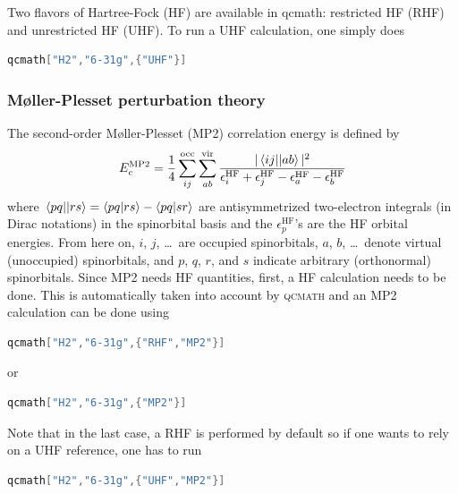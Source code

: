 \documentclass[aip,jcp,reprint,noshowkeys,superscriptaddress]{revtex4-1}
\newcommand{\EcMP}{E_c^{\text{MP2}}}
\newcommand{\eHF}[1]{\epsilon^\text{HF}_{#1}}
\newcommand{\qcmath}{\textsc{qcmath}\xspace}
\begin{document}
Two flavors of Hartree-Fock (HF) are available in qcmath: restricted HF (RHF) and unrestricted HF (UHF). To run a UHF calculation, one simply does
\begin{lstlisting}[extendedchars=true,language=Mathematica]
	qcmath["H2","6-31g",{"UHF"}]
\end{lstlisting}

\subsubsection*{M\o{}ller-Plesset perturbation theory}
The second-order M\o{}ller-Plesset (MP2) correlation energy is defined by 
\begin{equation}
	\EcMP = \frac{1}{4} \sum_{ij}^{\text{occ}} \sum_{ab}^{\text{vir}} \frac{ |\mel{ij}{}{ab}|^2 }{\eHF{i} + \eHF{j} - \eHF{a} - \eHF{b}}
\end{equation}
where $\mel{pq}{}{rs} = \braket{pq}{rs} - \braket{pq}{sr}$ are antisymmetrized two-electron integrals (in Dirac notations) in the spinorbital basis and the $\eHF{p}$'s are the HF orbital energies.
From here on, $i$, $j$, \ldots~are occupied spinorbitals, $a$, $b$, \ldots~denote virtual (unoccupied) spinorbitals, and $p$, $q$, $r$, and $s$ indicate arbitrary (orthonormal) spinorbitals.
Since MP2 needs HF quantities, first, a HF calculation needs to be done. This is automatically taken into account by \qcmath and an MP2 calculation can be done using 
\begin{lstlisting}[extendedchars=true,language=Mathematica]
	qcmath["H2","6-31g",{"RHF","MP2"}]
\end{lstlisting}
or 
\begin{lstlisting}[extendedchars=true,language=Mathematica]
	qcmath["H2","6-31g",{"MP2"}]
\end{lstlisting}
Note that in the last case, a RHF is performed by default so if one wants to rely on a UHF reference, one has to run
\begin{lstlisting}[extendedchars=true,language=Mathematica]
	qcmath["H2","6-31g",{"UHF","MP2"}]
\end{lstlisting}

\end{document}
